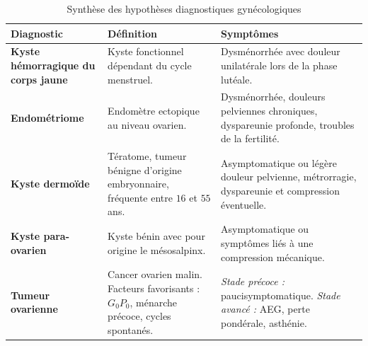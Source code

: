 \begin{table}[htbp]
  \centering
  \caption{Synthèse des hypothèses diagnostiques gynécologiques}
  \label{tab:hypothesesDiagnostiques}
  \small
  \begin{tabularx}{\textwidth}{>{\bfseries}p{3cm} X X}
    \toprule
    Diagnostic & Définition & Symptômes \\
    \midrule
    Kyste hémorragique du corps jaune &
    Kyste fonctionnel dépendant du cycle menstruel. &
    Dysménorrhée avec douleur unilatérale lors de la phase lutéale. \\
    \addlinespace
    Endométriome &
    Endomètre ectopique au niveau ovarien. &
    Dysménorrhée, douleurs pelviennes chroniques, dyspareunie profonde, troubles de la fertilité. \\
    \addlinespace
    Kyste dermoïde &
    Tératome, tumeur bénigne d'origine embryonnaire, fréquente entre $16$ et $55$ ans. &
    Asymptomatique ou légère douleur pelvienne, métrorragie, dyspareunie et compression éventuelle. \\
    \addlinespace
    Kyste para-ovarien &
    Kyste bénin avec pour origine le mésosalpinx. &
    Asymptomatique ou symptômes liés à une compression mécanique. \\
    \addlinespace
    Tumeur ovarienne &
    Cancer ovarien malin. Facteurs favorisants : $G_0 P_0$, ménarche précoce, cycles spontanés. &
    \emph{Stade précoce :} paucisymptomatique.\newline
    \emph{Stade avancé :} AEG, perte pondérale, asthénie. \\
    \bottomrule
  \end{tabularx}
\end{table}

